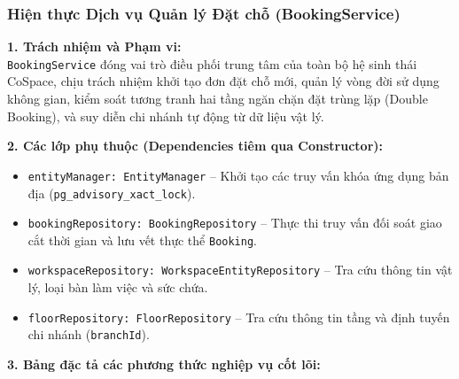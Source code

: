\subsubsection{Hiện thực Dịch vụ Quản lý Đặt chỗ (BookingService)}

\noindent\textbf{1. Trách nhiệm và Phạm vi:}\\
\texttt{BookingService} đóng vai trò điều phối trung tâm của toàn bộ hệ sinh thái CoSpace, chịu trách nhiệm khởi tạo đơn đặt chỗ mới, quản lý vòng đời sử dụng không gian, kiểm soát tương tranh hai tầng ngăn chặn đặt trùng lặp (Double Booking), và suy diễn chi nhánh tự động từ dữ liệu vật lý.

\noindent\textbf{2. Các lớp phụ thuộc (Dependencies tiêm qua Constructor):}
\begin{itemize}
    \item \texttt{entityManager: EntityManager} -- Khởi tạo các truy vấn khóa ứng dụng bản địa (\texttt{pg\_advisory\_xact\_lock}).
    \item \texttt{bookingRepository: BookingRepository} -- Thực thi truy vấn đối soát giao cắt thời gian và lưu vết thực thể \texttt{Booking}.
    \item \texttt{workspaceRepository: WorkspaceEntityRepository} -- Tra cứu thông tin vật lý, loại bàn làm việc và sức chứa.
    \item \texttt{floorRepository: FloorRepository} -- Tra cứu thông tin tầng và định tuyến chi nhánh (\texttt{branchId}).
\end{itemize}

\noindent\textbf{3. Bảng đặc tả các phương thức nghiệp vụ cốt lõi:}

